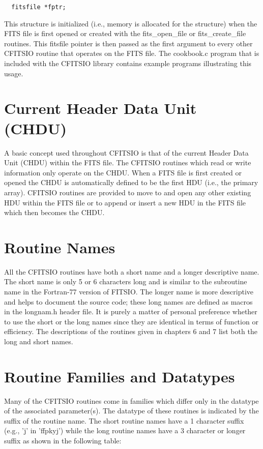 \begin{verbatim}
  fitsfile *fptr;
\end{verbatim}
This structure is initialized (i.e., memory is allocated
for the structure) when the FITS file is first opened or created
with the fits\_open\_file or fits\_create\_file routines.  This fitsfile
pointer is then passed as the first argument to every other CFITSIO
routine that operates on the FITS file.  The cookbook.c program
that is included with the CFITSIO library contains example programs
illustrating this usage.


\section{Current Header Data Unit (CHDU)}

A basic concept used throughout CFITSIO is that of the current Header
Data Unit (CHDU) within the FITS file. The CFITSIO routines which read
or write information only operate on the CHDU.  When a FITS file is first
created or opened the CHDU is automatically defined to be the first HDU
(i.e., the primary array).  CFITSIO routines are provided to move
to and open any other existing HDU within the FITS file or to append or
insert a new HDU in the FITS file which then becomes the CHDU.


\section{Routine Names}

All the CFITSIO routines have both a short name and a longer
descriptive name.  The short name is only 5 or 6 characters long and is
similar to the subroutine name in the Fortran-77 version of FITSIO.
The longer name is more descriptive and helps to document the source
code; these long names are defined as macros in the longnam.h header
file.  It is purely a matter of personal preference whether to use the
short or the long names since they are identical in terms of function
or efficiency.  The descriptions of the routines given in chapters 6
and 7 list both the long and short names.


\section{Routine Families and Datatypes}

Many of the CFITSIO routines come in families which differ only in the
datatype of the associated parameter(s).  The datatype of these
routines is indicated by the suffix of the routine name.  The short
routine names have a 1 character suffix (e.g., 'j' in 'ffpkyj')
while the long routine names have a 3 character or longer suffix
as shown in the following table:

